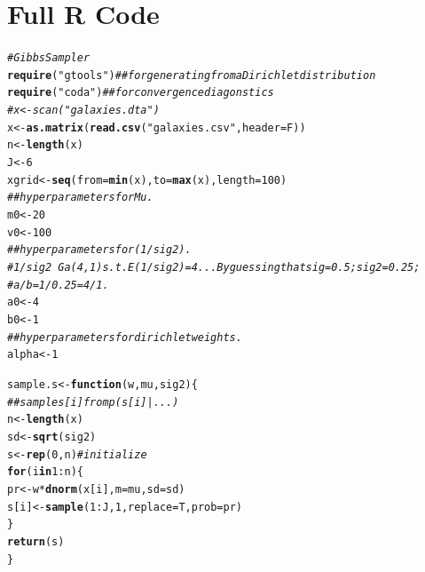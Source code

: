 \documentclass[12pt,letterpaper]{article}\usepackage[]{graphicx}\usepackage[]{color}
\makeatletter
\newcommand{\hlnum}[1]{\textcolor[rgb]{0.686,0.059,0.569}{#1}}%
\newcommand{\hlstr}[1]{\textcolor[rgb]{0.192,0.494,0.8}{#1}}%
\newcommand{\hlcom}[1]{\textcolor[rgb]{0.678,0.584,0.686}{\textit{#1}}}%
\newcommand{\hlopt}[1]{\textcolor[rgb]{0,0,0}{#1}}%
\newcommand{\hlstd}[1]{\textcolor[rgb]{0.345,0.345,0.345}{#1}}%
\newcommand{\hlkwa}[1]{\textcolor[rgb]{0.161,0.373,0.58}{\textbf{#1}}}%
\newcommand{\hlkwb}[1]{\textcolor[rgb]{0.69,0.353,0.396}{#1}}%
\newcommand{\hlkwc}[1]{\textcolor[rgb]{0.333,0.667,0.333}{#1}}%
\newcommand{\hlkwd}[1]{\textcolor[rgb]{0.737,0.353,0.396}{\textbf{#1}}}%
\newenvironment{kframe}{%
 \def\at@end@of@kframe{}%
 \ifinner\ifhmode%
  \def\at@end@of@kframe{\end{minipage}}%
  \begin{minipage}{\columnwidth}%
 \fi\fi%
 \def\FrameCommand##1{\hskip\@totalleftmargin \hskip-\fboxsep
 \colorbox{shadecolor}{##1}\hskip-\fboxsep
     \hskip-\linewidth \hskip-\@totalleftmargin \hskip\columnwidth}%
 \MakeFramed {\advance\hsize-\width
   \@totalleftmargin\z@ \linewidth\hsize
   \@setminipage}}%
 {\par\unskip\endMakeFramed%
 \at@end@of@kframe}
\newenvironment{knitrout}{}{} %
\makeatother
\begin{document}
\section{Full R Code}
\begin{knitrout}
\color{fgcolor}\begin{kframe}
\begin{alltt}
\hlcom{# Gibbs Sampler}
\hlkwd{require}\hlstd{(}\hlstr{"gtools"}\hlstd{)} \hlcom{## for generating from a Dirichlet distribution}
\hlkwd{require}\hlstd{(}\hlstr{"coda"}\hlstd{)} \hlcom{## for convergence diagonstics}
\hlcom{#x <- scan("galaxies.dta")}
\hlstd{x} \hlkwb{<-} \hlkwd{as.matrix}\hlstd{(}\hlkwd{read.csv}\hlstd{(}\hlstr{"galaxies.csv"} \hlstd{,}\hlkwc{header}\hlstd{=F))}
\hlstd{n} \hlkwb{<-} \hlkwd{length}\hlstd{(x)}
\hlstd{J} \hlkwb{<-} \hlnum{6}
\hlstd{xgrid} \hlkwb{<-} \hlkwd{seq}\hlstd{(}\hlkwc{from}\hlstd{=}\hlkwd{min}\hlstd{(x),}\hlkwc{to}\hlstd{=}\hlkwd{max}\hlstd{(x),}\hlkwc{length}\hlstd{=}\hlnum{100}\hlstd{)}
\hlcom{## hyperparameters for Mu.}
\hlstd{m0} \hlkwb{<-} \hlnum{20}
\hlstd{v0} \hlkwb{<-} \hlnum{100}
\hlcom{## hyperparameters for (1/sig2).}
\hlcom{# 1/sig2 ~ Ga(4, 1) s.t. E(1/sig2) = 4... By guessing that sig=0.5; sig2=0.25;}
\hlcom{# a/b = 1/0.25 = 4/1.}
\hlstd{a0} \hlkwb{<-} \hlnum{4}
\hlstd{b0} \hlkwb{<-} \hlnum{1}
\hlcom{## hyperparameters for dirichlet weights.}
\hlstd{alpha} \hlkwb{<-} \hlnum{1}

\hlstd{sample.s} \hlkwb{<-} \hlkwa{function}\hlstd{(}\hlkwc{w}\hlstd{,} \hlkwc{mu}\hlstd{,} \hlkwc{sig2}\hlstd{) \{}
  \hlcom{## sample s[i] from p(s[i] | ...) }
  \hlstd{n} \hlkwb{<-} \hlkwd{length}\hlstd{(x)}
  \hlstd{sd} \hlkwb{<-} \hlkwd{sqrt}\hlstd{(sig2)}
  \hlstd{s} \hlkwb{<-} \hlkwd{rep}\hlstd{(}\hlnum{0}\hlstd{,n)} \hlcom{# initialize }
  \hlkwa{for}\hlstd{(i} \hlkwa{in} \hlnum{1}\hlopt{:}\hlstd{n)\{}
    \hlstd{pr} \hlkwb{<-} \hlstd{w}\hlopt{*}\hlkwd{dnorm}\hlstd{(x[i],} \hlkwc{m}\hlstd{=mu,} \hlkwc{sd}\hlstd{=sd)}
    \hlstd{s[i]} \hlkwb{<-} \hlkwd{sample}\hlstd{(}\hlnum{1}\hlopt{:}\hlstd{J,} \hlnum{1}\hlstd{,} \hlkwc{replace}\hlstd{=T,} \hlkwc{prob}\hlstd{=pr)}
  \hlstd{\}}
  \hlkwd{return}\hlstd{(s)}
\hlstd{\}}


\end{alltt}
\end{kframe}
\end{knitrout}
\end{document}
